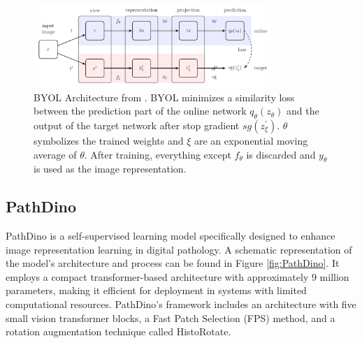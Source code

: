 \documentclass[peerreview]{IEEEtran}
\begin{document}
\begin{figure}
\centering
\includegraphics[width=0.8\textwidth]{figure/BYOL.png} 
\caption{\small BYOL Architecture from \cite{byol}. BYOL minimizes a similarity loss between the prediction part of the online network $q_{\theta}(z_{\theta})$ and the output of the target network after stop gradient $sg(z^{'}_\xi)$. $\theta$ symbolizes the trained weights and $\xi$ are an exponential moving average of $\theta$. After training, everything except $f_\theta$ is discarded and $y_\theta$ is used as the image representation. }
\label{fig:BYOL}
\end{figure}

\subsection{PathDino}
PathDino is a self-supervised learning model specifically designed to enhance image representation learning in digital pathology. A schematic representation of the model's architecture and process can be found in Figure \ref{fig:PathDino}. It employs a compact transformer-based architecture with approximately 9 million parameters, making it efficient for deployment in systems with limited computational resources. PathDino's framework includes an architecture with five small vision transformer blocks, a Fast Patch Selection (FPS) method, and a rotation augmentation technique called HistoRotate.
\end{document}
